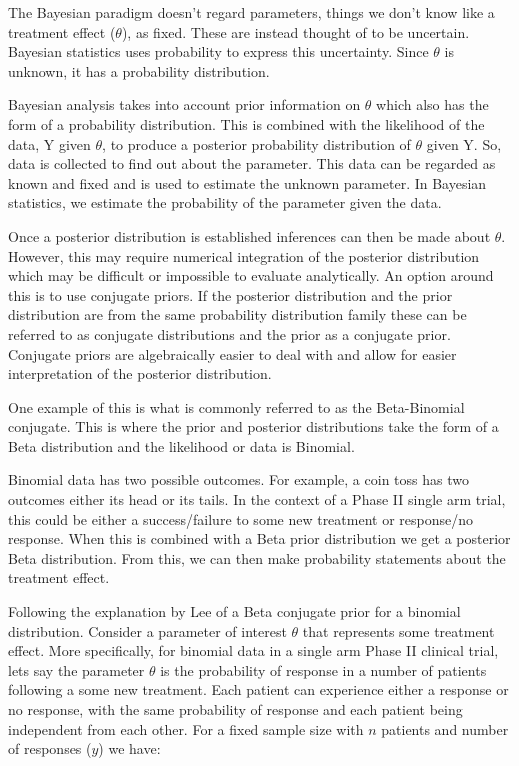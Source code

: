 The Bayesian paradigm doesn’t regard parameters, things we don’t know like a treatment effect ($\theta$), as fixed. These are instead thought of to be uncertain. Bayesian statistics uses probability to express this uncertainty. Since $\theta$ is unknown, it has a probability distribution. 

Bayesian analysis takes into account prior information on $\theta$ which also has the form of a probability distribution. This is combined with the likelihood of the data, Y given $\theta$, to produce a posterior probability distribution of $\theta$ given Y. So, data is collected to find out about the parameter. This data can be regarded as known and fixed and is used to estimate the unknown parameter. In Bayesian statistics, we estimate the probability of the parameter given the data.

Once a posterior distribution is established inferences can then be made about $\theta$. However, this may require numerical integration of the posterior distribution which may be difficult or impossible to evaluate analytically. An option around this is to use conjugate priors. If the posterior distribution and the prior distribution are from the same probability distribution family these can be referred to as conjugate distributions and the prior as a conjugate prior. Conjugate priors are algebraically easier to deal with and allow for easier interpretation of the posterior distribution. 

One example of this is what is commonly referred to as the Beta-Binomial conjugate. This is where the prior and posterior distributions take the form of a Beta distribution and the likelihood or data is Binomial. 

Binomial data has two possible outcomes. For example, a coin toss has two outcomes either its head or its tails. In the context of a Phase II single arm trial, this could be either a success/failure to some new treatment or response/no response. When this is combined with a Beta prior distribution we get a posterior Beta distribution. From this, we can then make probability statements about the treatment effect.

Following the explanation by Lee \cite{leeBayesianStatisticsIntroduction2012} of a Beta conjugate prior for a binomial distribution. Consider a parameter of interest $\theta$ that represents some treatment effect. More specifically, for binomial data in a single arm Phase \RN{2} clinical trial, lets say the parameter $\theta$ is the probability of response in a number of patients following a some new treatment. Each patient can experience either a response or no response, with the same probability of response and each patient being independent from each other. For a fixed sample size with $n$ patients and number of responses ($y$) we have: 

